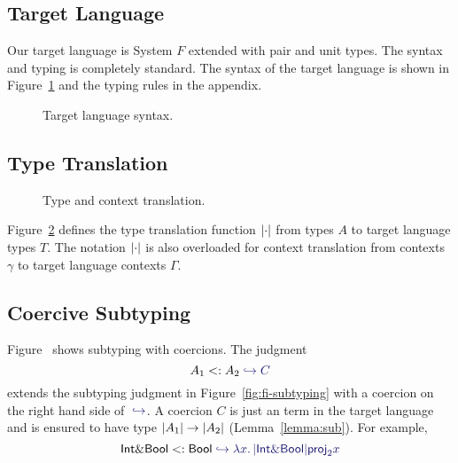 \subsection{Target Language}

Our target language is System $F$ extended with pair and unit types. The syntax
and typing is completely standard. The syntax of the target language is shown in
Figure~\ref{fig:f-syntax} and the typing rules in the appendix.
\begin{figure}[h]
  
  \caption{Target language syntax.}
  \label{fig:f-syntax}
\end{figure}



\subsection{Type Translation}

\begin{figure}[h]
  
  
  \caption{Type and context translation.}
  \label{fig:type-and-context-translation}
\end{figure}

Figure~\ref{fig:type-and-context-translation} defines the type translation
function $\lvert \cdot \rvert$ from \name types $A$ to target language types $T$. The
notation $\lvert \cdot \rvert$ is also overloaded for context translation from \name
contexts $\gamma$ to target language contexts $\Gamma$.


\subsection{Coercive Subtyping}

Figure~ shows subtyping with coercions. The judgment
\[
A_1 \subtype A_2 \yields C
\]
extends the subtyping judgment in Figure~\ref{fig:fi-subtyping} with a coercion
on the right hand side of $ \yields {} $. A coercion $ C $ is just an term
in the target language and is ensured to have type
$ \lvert A_1 \rvert \to \lvert A_2 \rvert $ (Lemma~\ref{lemma:sub}). For example,
\[
\tyint \inter \tybool \subtype \tybool \yields {\lam x {\im {\tyint \inter \tybool}} {\proj 2 x}}
\]

